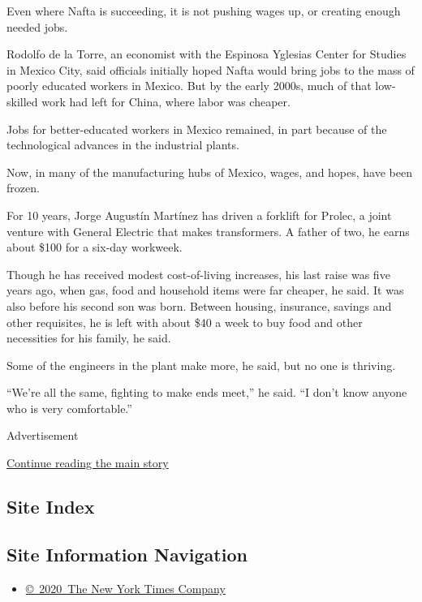 Even where Nafta is succeeding, it is not pushing wages up, or creating
enough needed jobs.

Rodolfo de la Torre, an economist with the Espinosa Yglesias Center for
Studies in Mexico City, said officials initially hoped Nafta would bring
jobs to the mass of poorly educated workers in Mexico. But by the early
2000s, much of that low-skilled work had left for China, where labor was
cheaper.

Jobs for better-educated workers in Mexico remained, in part because of
the technological advances in the industrial plants.

Now, in many of the manufacturing hubs of Mexico, wages, and hopes, have
been frozen.

For 10 years, Jorge Augustín Martínez has driven a forklift for Prolec,
a joint venture with General Electric that makes transformers. A father
of two, he earns about \$100 for a six-day workweek.

Though he has received modest cost-of-living increases, his last raise
was five years ago, when gas, food and household items were far cheaper,
he said. It was also before his second son was born. Between housing,
insurance, savings and other requisites, he is left with about \$40 a
week to buy food and other necessities for his family, he said.

Some of the engineers in the plant make more, he said, but no one is
thriving.

``We're all the same, fighting to make ends meet,'' he said. ``I don't
know anyone who is very comfortable.''

Advertisement

\protect\hyperlink{after-bottom}{Continue reading the main story}

\hypertarget{site-index}{%
\subsection{Site Index}\label{site-index}}

\hypertarget{site-information-navigation}{%
\subsection{Site Information
Navigation}\label{site-information-navigation}}

\begin{itemize}
\tightlist
\item
  \href{https://help.nytimes.com/hc/en-us/articles/115014792127-Copyright-notice}{©~2020~The
  New York Times Company}
\end{itemize}


